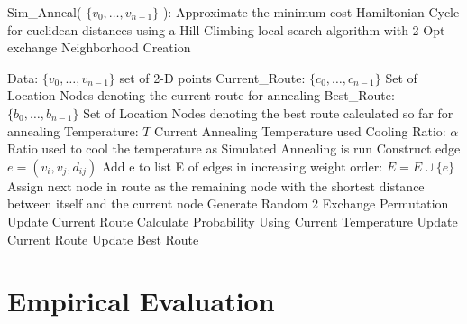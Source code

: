 \documentclass[format=sigconf]{acmart}
\begin{document}
\begin{algorithm}[H] 
	\caption{  Sim\_Anneal( $\{v_0, \hdots, v_{n-1}\}$ ): Approximate the minimum cost Hamiltonian Cycle for euclidean distances using a Hill Climbing local search algorithm with 2-Opt exchange Neighborhood Creation}
	\begin{algorithmic} 
		\STATE Data: $\{v_0, \hdots, v_{n-1}\}$ set of 2-D points
		\STATE Current\_Route: $\{c_0, \hdots, c_{n-1}\}$ Set of Location Nodes denoting the current route for annealing
		\STATE Best\_Route: $\{b_0, \hdots, b_{n-1}\}$ Set of Location Nodes denoting the best route calculated so far for annealing
		\STATE Temperature: $T$ Current Annealing Temperature used
		\STATE Cooling Ratio: $\alpha$ Ratio used to cool the temperature as Simulated Annealing is run
			\STATE Construct edge $e = (v_i, v_j, d_{ij})$
			\STATE Add e to list E of edges in increasing weight order: $E = E \cup \{e\}$
		\ENDFOR
			\STATE Assign next node in route as the remaining node with the shortest distance between itself and the current node
		\ENDWHILE
			\STATE Generate Random 2 Exchange Permutation
				\STATE Update Current Route
			\ELSE
				\STATE Calculate Probability Using Current Temperature
					\STATE Update Current Route
				\ENDIF
			\ENDIF
				\STATE Update Best Route
			\ENDIF
		\ENDWHILE
	\end{algorithmic}
\end{algorithm}
\section*{Empirical Evaluation}




\end{document}
